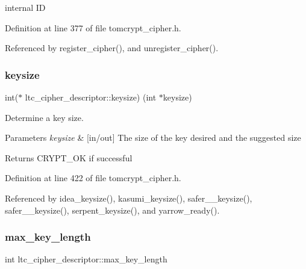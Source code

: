 internal ID 



Definition at line 377 of file tomcrypt\+\_\+cipher.\+h.



Referenced by register\+\_\+cipher(), and unregister\+\_\+cipher().

\mbox{\label{structltc__cipher__descriptor_a870e4e0c0a4d398d4533724a44259f5f}} 
\subsubsection{\texorpdfstring{keysize}{keysize}}
{\footnotesize\ttfamily int($\ast$ ltc\+\_\+cipher\+\_\+descriptor\+::keysize) (int $\ast$keysize)}



Determine a key size. 


\begin{DoxyParams}{Parameters}
{\em keysize} & \mbox{[}in/out\mbox{]} The size of the key desired and the suggested size \\
\hline
\end{DoxyParams}
\begin{DoxyReturn}{Returns}
C\+R\+Y\+P\+T\+\_\+\+OK if successful 
\end{DoxyReturn}


Definition at line 422 of file tomcrypt\+\_\+cipher.\+h.



Referenced by idea\+\_\+keysize(), kasumi\+\_\+keysize(), safer\+\_\+\_\+keysize(), safer\+\_\+\_\+keysize(), serpent\+\_\+keysize(), and yarrow\+\_\+ready().

\mbox{\label{structltc__cipher__descriptor_a16bbbdbee9700eb13054d8edd2821456}} 
\subsubsection{\texorpdfstring{max\_key\_length}{max\_key\_length}}
{\footnotesize\ttfamily int ltc\+\_\+cipher\+\_\+descriptor\+::max\+\_\+key\+\_\+length}



